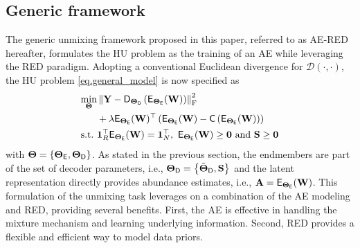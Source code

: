 \documentclass[journal,a4paper]{IEEEtran}
\newcommand{\bTheta}{\boldsymbol{\Theta}}
\newcommand{\MATend}{\mathbf{S}}
\begin{document}
\subsection{Generic framework}
The generic unmixing framework proposed in this paper, referred to as AE-RED hereafter, formulates the HU problem as the training of an AE while leveraging  the RED paradigm. Adopting a conventional Euclidean divergence for $\mathcal{D}(\cdot,\cdot)$, the HU problem
\eqref{eq.general_model} is now specified as
\begin{equation}
\begin{aligned}\label{eq_mdoel_2D_RED}
  \min_{\bTheta}&
  \left\|\mathbf{Y}-\mathsf{D}_{\bTheta_{\sf D}}\left(
  \mathsf{E}_{\bTheta_{\sf E}}(\mathbf{W})\right)\right\|_{\text{F}}^2\\
  &+\lambda \mathsf{E}_{\bTheta_{\sf E}}(\mathbf{W})^\top\left(\mathsf{E}_{\bTheta_{\sf E}}(\mathbf{W})-\mathsf{C}\left(\mathsf{E}_{\bTheta_{\sf E}}(\mathbf{W})\right)\right)\\
  \text{s.t.}\  &\boldsymbol{1}^{\top}_{R}\mathsf{E}_{\bTheta_{\sf E}}(\mathbf{W})=\boldsymbol{1}_{N}^{\top},~\mathsf{E}_{\bTheta_{\sf E}}(\mathbf{W})\geq \boldsymbol{0}~\text{and}~\MATend \geq \boldsymbol{0}
\end{aligned}
\end{equation}
with $\bTheta = \left\{\bTheta_{\sf E}, \bTheta_{\sf D}\right\}$. As stated in the previous section, the endmembers are part of the set of decoder parameters, i.e., $\bTheta_{\sf D}=\left\{\tilde{\bTheta}_{\sf D},\MATend\right\}$ and the latent representation directly provides abundance estimates, i.e., $\mathbf{A}=\mathsf{E}_{\bTheta_{\sf E}}(\mathbf{W})$. This formulation of the unmixing task leverages on a combination of the AE modeling and RED, providing several benefits. First, the AE is effective in handling the mixture mechanism and learning underlying information. Second, RED provides a flexible and efficient way to model data priors.
\end{document}
